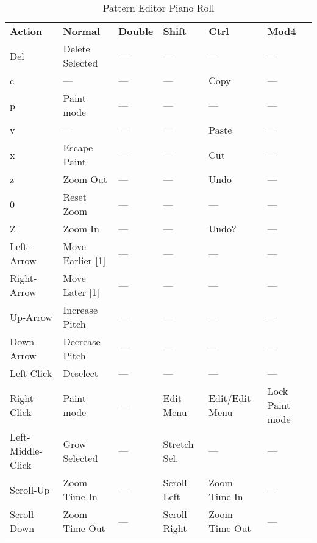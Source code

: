    \begin{table}[H]
      \centering
      \caption{Pattern Editor Piano Roll}
      \label{table:pattern_editor_piano_roll}
      \begin{tabular}{l l l l l l}
         \textbf{Action}   & \textbf{Normal} & \textbf{Double}    & \textbf{Shift} & \textbf{Ctrl}   & \textbf{Mod4}      \\
         Del               & Delete Selected & ---                & ---            & ---             & ---                \\
         c                 & ---             & ---                & ---            & Copy            & ---                \\
         p                 & Paint mode      & ---                & ---            & ---             & ---                \\
         v                 & ---             & ---                & ---            & Paste           & ---                \\
         x                 & Escape Paint    & ---                & ---            & Cut             & ---                \\
         z                 & Zoom Out        & ---                & ---            & Undo            & ---                \\
         0                 & Reset Zoom      & ---                & ---            & ---             & ---                \\
         Z                 & Zoom In         & ---                & ---            & Undo?           & ---                \\
         Left-Arrow        & Move Earlier [1] & ---               & ---            & ---             & ---                \\
         Right-Arrow       & Move Later [1]  & ---                & ---            & ---             & ---                \\
         Up-Arrow          & Increase Pitch  & ---                & ---            & ---             & ---                \\
         Down-Arrow        & Decrease Pitch  & ---                & ---            & ---             & ---                \\
         Left-Click        & Deselect        & ---                & ---            & ---             & ---                \\
         Right-Click       & Paint mode      & ---                & Edit Menu      & Edit/Edit Menu  & Lock Paint mode    \\
         Left-Middle-Click & Grow Selected   & ---                & Stretch Sel.   & ---             & ---                \\
         Scroll-Up         & Zoom Time In    & ---                & Scroll Left    & Zoom Time In    & ---                \\
         Scroll-Down       & Zoom Time Out   & ---                & Scroll Right   & Zoom Time Out   & ---                \\
      \end{tabular}
   \end{table}

